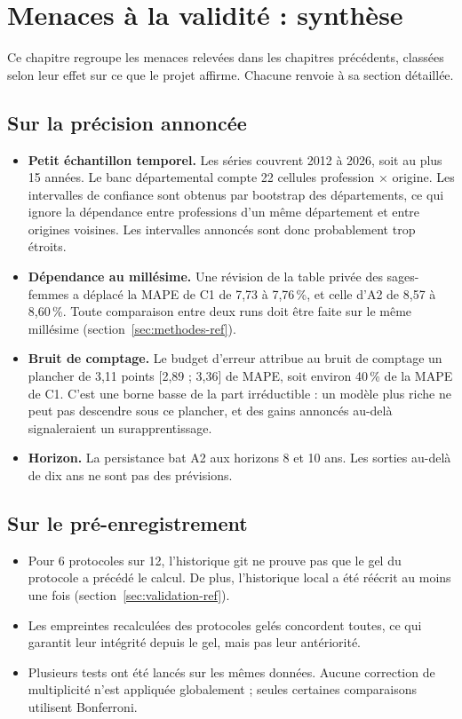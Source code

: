 \section{Menaces à la validité : synthèse}\label{sec:menaces-ref}

Ce chapitre regroupe les menaces relevées dans les chapitres précédents, classées selon leur effet sur ce que le
projet affirme. Chacune renvoie à sa section détaillée.

\subsection{Sur la précision annoncée}
\begin{itemize}
\item \textbf{Petit échantillon temporel.} Les séries couvrent 2012 à 2026, soit au plus 15 années. Le banc
  départemental compte 22 cellules profession × origine. Les intervalles de confiance sont obtenus par bootstrap des
  départements, ce qui ignore la dépendance entre professions d'un même département et entre origines voisines. Les
  intervalles annoncés sont donc probablement trop étroits\derive.
\item \textbf{Dépendance au millésime.} Une révision de la table privée des sages-femmes a déplacé la MAPE de C1
  de 7,73 à 7,76\,\%\mesure, et celle d'A2 de 8,57 à 8,60\,\%\mesure. Toute comparaison entre deux runs doit être
  faite sur le même millésime (section~\ref{sec:methodes-ref}).
\item \textbf{Bruit de comptage.} Le budget d'erreur attribue au bruit de comptage un plancher de 3,11
  points\derive{} [2,89 ; 3,36] de MAPE, soit environ 40\,\%\derive{} de la MAPE de C1. C'est une borne basse de la
  part irréductible : un modèle plus riche ne peut pas descendre sous ce plancher, et des gains annoncés au-delà
  signaleraient un surapprentissage.
\item \textbf{Horizon.} La persistance bat A2 aux horizons 8 et 10 ans\mesure. Les sorties au-delà de dix ans ne
  sont pas des prévisions.
\end{itemize}

\subsection{Sur le pré-enregistrement}
\begin{itemize}
\item Pour 6 protocoles sur 12, l'historique git ne prouve pas que le gel du protocole a précédé le calcul. De plus,
  l'historique local a été réécrit au moins une fois (section~\ref{sec:validation-ref}).
\item Les empreintes recalculées des protocoles gelés concordent toutes\mesure, ce qui garantit leur intégrité
  depuis le gel, mais pas leur antériorité.
\item Plusieurs tests ont été lancés sur les mêmes données. Aucune correction de multiplicité n'est appliquée
  globalement ; seules certaines comparaisons utilisent Bonferroni.
\end{itemize}

